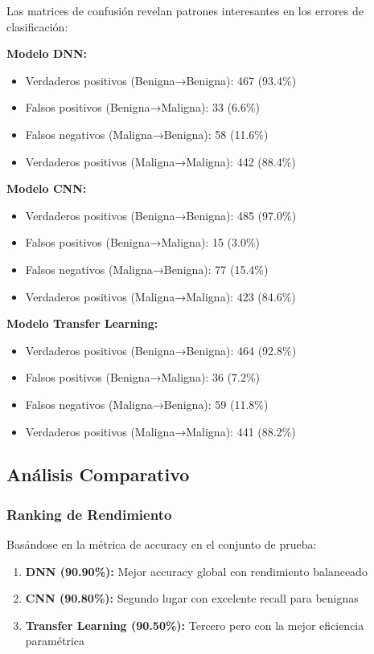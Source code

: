 \documentclass[11pt, a4paper]{article}
\begin{document}
Las matrices de confusión revelan patrones interesantes en los errores de clasificación:

\textbf{Modelo DNN:}
\begin{itemize}
    \item Verdaderos positivos (Benigna→Benigna): 467 (93.4\%)
    \item Falsos positivos (Benigna→Maligna): 33 (6.6\%)
    \item Falsos negativos (Maligna→Benigna): 58 (11.6\%)
    \item Verdaderos positivos (Maligna→Maligna): 442 (88.4\%)
\end{itemize}

\textbf{Modelo CNN:}
\begin{itemize}
    \item Verdaderos positivos (Benigna→Benigna): 485 (97.0\%)
    \item Falsos positivos (Benigna→Maligna): 15 (3.0\%)
    \item Falsos negativos (Maligna→Benigna): 77 (15.4\%)
    \item Verdaderos positivos (Maligna→Maligna): 423 (84.6\%)
\end{itemize}

\textbf{Modelo Transfer Learning:}
\begin{itemize}
    \item Verdaderos positivos (Benigna→Benigna): 464 (92.8\%)
    \item Falsos positivos (Benigna→Maligna): 36 (7.2\%)
    \item Falsos negativos (Maligna→Benigna): 59 (11.8\%)
    \item Verdaderos positivos (Maligna→Maligna): 441 (88.2\%)
\end{itemize}

\subsection{Análisis Comparativo}

\subsubsection{Ranking de Rendimiento}

Basándose en la métrica de accuracy en el conjunto de prueba:

\begin{enumerate}
    \item \textbf{DNN (90.90\%):} Mejor accuracy global con rendimiento balanceado
    \item \textbf{CNN (90.80\%):} Segundo lugar con excelente recall para benignas
    \item \textbf{Transfer Learning (90.50\%):} Tercero pero con la mejor eficiencia paramétrica
\end{enumerate}
\end{document}
